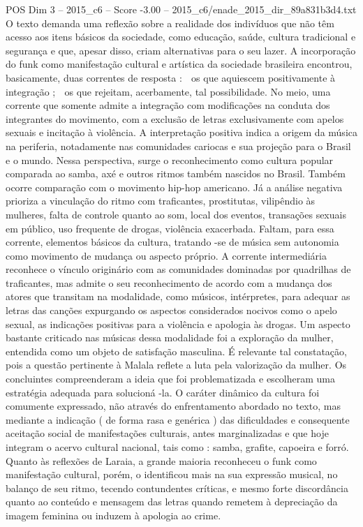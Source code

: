 \begin{textsample}{POS Dim 3 – 2015\_c6 – Score -3.00 – 2015\_c6/enade\_2015\_dir\_89a831b3d4.txt}
O texto demanda uma reflexão sobre a realidade dos indivíduos que não têm acesso aos itens básicos da sociedade, como educação, saúde, cultura tradicional e segurança e que, apesar disso, criam alternativas para o seu lazer.
A incorporação do funk como manifestação cultural e artística da sociedade brasileira encontrou, basicamente, duas correntes de resposta :  os que aquiescem positivamente à integração ;  os que rejeitam, acerbamente, tal possibilidade.
No meio, uma corrente que somente admite a integração com modificações na conduta dos integrantes do movimento, com a exclusão de letras exclusivamente com apelos sexuais e incitação à violência.
A interpretação positiva indica a origem da música na periferia, notadamente nas comunidades cariocas e sua projeção para o Brasil e o mundo.
Nessa perspectiva, surge o reconhecimento como cultura popular comparada ao samba, axé e outros ritmos também nascidos no Brasil.
Também ocorre comparação com o movimento hip-hop americano.
Já a análise negativa prioriza a vinculação do ritmo com traficantes, prostitutas, vilipêndio às mulheres, falta de controle quanto ao som, local dos eventos, transações sexuais em público, uso frequente de drogas, violência exacerbada.
Faltam, para essa corrente, elementos básicos da cultura, tratando -se de música sem autonomia como movimento de mudança ou aspecto próprio.
A corrente intermediária reconhece o vínculo originário com as comunidades dominadas por quadrilhas de traficantes, mas admite o seu reconhecimento de acordo com a mudança dos atores que transitam na modalidade, como músicos, intérpretes, para adequar as letras das canções expurgando os aspectos considerados nocivos como o apelo sexual, as indicações positivas para a violência e apologia às drogas.
Um aspecto bastante criticado nas músicas dessa modalidade foi a exploração da mulher, entendida como um objeto de satisfação masculina.
É relevante tal constatação, pois a questão pertinente à Malala reflete a luta pela valorização da mulher.
Os concluintes compreenderam a ideia que foi problematizada e escolheram uma estratégia adequada para solucioná -la.
O caráter dinâmico da cultura foi comumente expressado, não através do enfrentamento abordado no texto, mas mediante a indicação ( de forma rasa e genérica ) das dificuldades e consequente aceitação social de manifestações culturais, antes marginalizadas e que hoje integram o acervo cultural nacional, tais como : samba, grafite, capoeira e forró.
Quanto às reflexões de Laraia, a grande maioria reconheceu o funk como manifestação cultural, porém, o identificou mais na sua expressão musical, no balanço de seu ritmo, tecendo contundentes críticas, e mesmo forte discordância quanto ao conteúdo e mensagem das letras quando remetem à depreciação da imagem feminina ou induzem à apologia ao crime.

\end{textsample}

